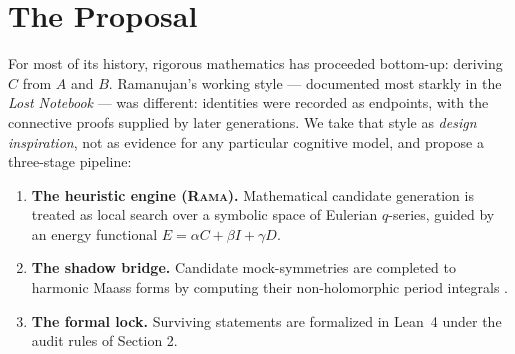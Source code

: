 \section{The Proposal}\label{sec:proposal}
For most of its history, rigorous mathematics has proceeded bottom-up:
deriving $C$ from $A$ and $B$. Ramanujan's working style --- documented most
starkly in the \emph{Lost Notebook} \cite{Narosa1988, AndrewsBerndt} --- was different: identities were recorded as endpoints, with the connective proofs
supplied by later generations. We take that style as \emph{design
inspiration}, not as evidence for any particular cognitive model, and propose a three-stage pipeline:

\begin{enumerate}
\item \textbf{The heuristic engine (\textsc{Rama}).} Mathematical candidate
generation is treated as local search over a symbolic space of Eulerian
$q$-series, guided by an energy functional
$E=\alpha C+\beta I+\gamma D$.
\item \textbf{The shadow bridge.} Candidate mock-symmetries are completed to
harmonic Maass forms by computing their non-holomorphic period integrals \cite{Zwegers2002}.
\item \textbf{The formal lock.} Surviving statements are formalized in
Lean~4 under the audit rules of Section 2.
\end{enumerate}
